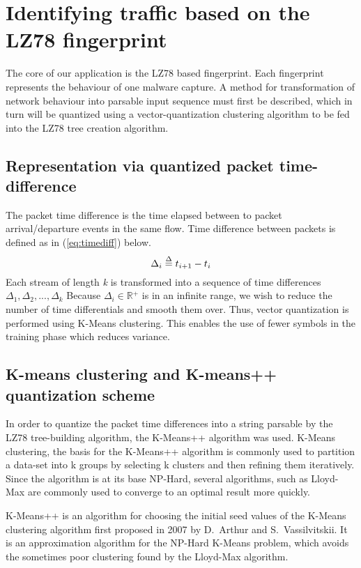\documentclass[13pt,journal,compsoc,onecolumn]{IEEEtran}
\begin{document}
\section{Identifying traffic based on the LZ78 fingerprint}
The core of our application is the LZ78 based fingerprint. Each fingerprint represents the behaviour of one malware capture.
A method for transformation of network behaviour into parsable input sequence must first be described, which in turn will be quantized using a vector-quantization clustering algorithm to be fed into the LZ78 tree creation algorithm.

\subsection{Representation via quantized packet time-difference}
The packet time difference is the time elapsed between to packet arrival/departure events in the same flow. Time difference between packets is defined as 
in (\ref{eq:timediff}) below.
\begin{equation}\label{eq:timediff}
\Delta _i \buildrel \Delta \over = {t_{i + 1}} - {t_i}
\end{equation}
Each stream of length \emph{k} is transformed into a sequence of time differences $\Delta _1, \Delta _2, ..., \Delta _k$
Because $\Delta _i \in \mathbb{R} {^ + }$  is in an infinite range, we wish to reduce the number of time differentials and smooth them over. Thus, vector quantization is performed using K-Means clustering. This enables the use of fewer symbols in the training phase which reduces variance.
\subsection{K-means clustering and K-means++ quantization scheme}
In order to quantize the packet time differences into a string parsable by the LZ78 tree-building algorithm, the K-Means++ algorithm was used.
K-Means clustering, the basis for the K-Means++ algorithm is commonly used to partition a data-set into k groups by selecting k clusters and then refining them iteratively. Since the algorithm is at its base NP-Hard, several algorithms, such as Lloyd-Max are commonly used to converge to an optimal result more quickly.

K-Means++ \cite{Art07} is an algorithm for choosing the initial seed values of the K-Means clustering algorithm first proposed in 2007 by D.~Arthur and S.~Vassilvitskii. It is an approximation algorithm for the NP-Hard K-Means problem, which avoids the sometimes poor clustering found by the Lloyd-Max algorithm.
\end{document}
